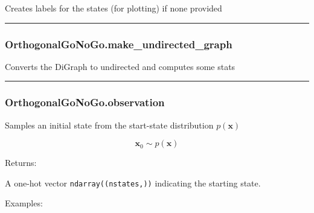 Creates labels for the states (for plotting) if none provided

\begin{center}\rule{0.5\linewidth}{\linethickness}\end{center}

\hypertarget{orthogonalgonogo.make_undirected_graph}{%
\subsubsection{OrthogonalGoNoGo.make\_undirected\_graph}\label{orthogonalgonogo.make_undirected_graph}}

\begin{Shaded}
\begin{Highlighting}[]
\NormalTok{)}
\end{Highlighting}
\end{Shaded}

Converts the DiGraph to undirected and computes some stats

\begin{center}\rule{0.5\linewidth}{\linethickness}\end{center}

\hypertarget{orthogonalgonogo.observation}{%
\subsubsection{OrthogonalGoNoGo.observation}\label{orthogonalgonogo.observation}}

\begin{Shaded}
\begin{Highlighting}[]
\NormalTok{)}
\end{Highlighting}
\end{Shaded}

Samples an initial state from the start-state distribution
\(p(\mathbf x)\)

\[
\mathbf x_0 \sim p(\mathbf x)
\]

Returns:

A one-hot vector \texttt{ndarray((nstates,))} indicating the starting
state.

Examples:

\begin{Shaded}
\begin{Highlighting}[]
\OperatorTok{=}
\end{Highlighting}
\end{Shaded}

